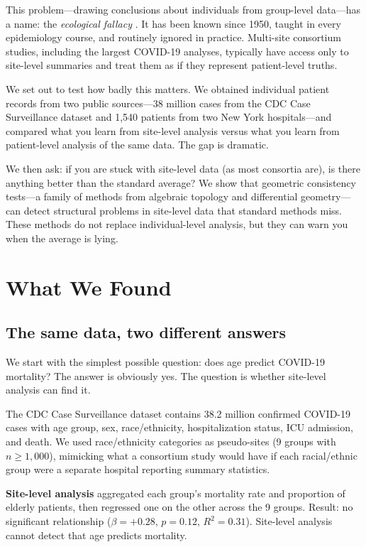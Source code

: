 \documentclass{article}
\begin{document}
This problem---drawing conclusions about individuals from group-level
data---has a name: the \emph{ecological fallacy}
\cite{robinson1950ecological}.  It has been known since 1950, taught in every
epidemiology course, and routinely ignored in practice.  Multi-site consortium
studies, including the largest COVID-19 analyses, typically have access only to
site-level summaries and treat them as if they represent patient-level truths.

We set out to test how badly this matters.  We obtained individual patient
records from two public sources---38 million cases from the CDC Case
Surveillance dataset and 1,540 patients from two New York hospitals---and
compared what you learn from site-level analysis versus what you learn from
patient-level analysis of the same data.  The gap is dramatic.

We then ask: if you are stuck with site-level data (as most consortia are), is
there anything better than the standard average?  We show that geometric
consistency tests---a family of methods from algebraic topology and
differential geometry---can detect structural problems in site-level data that
standard methods miss.  These methods do not replace individual-level analysis,
but they can warn you when the average is lying.


\section{What We Found}

\subsection{The same data, two different answers}

We start with the simplest possible question: does age predict COVID-19
mortality?  The answer is obviously yes.  The question is whether site-level
analysis can find it.

The CDC Case Surveillance dataset contains 38.2 million confirmed COVID-19
cases with age group, sex, race/ethnicity, hospitalization status, ICU
admission, and death.  We used race/ethnicity categories as pseudo-sites (9
groups with $n \geq 1{,}000$), mimicking what a consortium study would have
if each racial/ethnic group were a separate hospital reporting summary
statistics.

\textbf{Site-level analysis} aggregated each group's mortality rate and
proportion of elderly patients, then regressed one on the other across the 9
groups.  Result: no significant relationship ($\beta = +0.28$, $p = 0.12$,
$R^2 = 0.31$).  Site-level analysis cannot detect that age predicts mortality.
\end{document}
